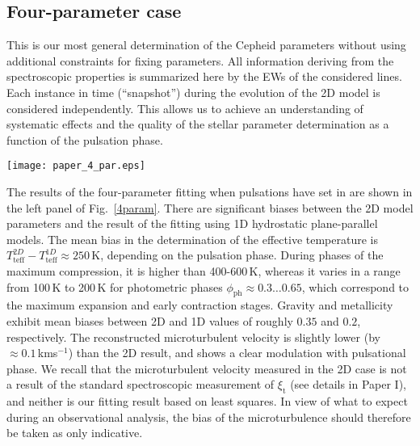\documentclass{aa}
\newcommand{\kmos}{kms$^{-1}$}
\begin{document}
\subsection{Four-parameter case}
This is our most general determination of the Cepheid parameters without using
additional constraints for fixing parameters. All information deriving from
the spectroscopic properties  is summarized here by the EWs of the
considered lines.  Each instance in time (``snapshot'') during the evolution
of the 2D model is considered independently.  This allows us to achieve an
understanding of systematic effects and the quality of the stellar
parameter determination as a function of the pulsation phase.
\begin{figure*}
\centering
\texttt{[image: paper\_4\_par.eps]}
\caption{Result of the four-parametric fitting for 
the pulsating (left panel) and non-pulsating (right panel) 
regimes. The parameters of the 2D model are shown by  orange 
lines for both regimes. The reconstructed parameters with the 1D LHD grid 
are shown by blue lines.  The relative RMS deviation $\sqrt{\xi^2}$ in  
line strengths  between the 2D  and 1D models is shown by the black line. 
}
\label{4param}
\end{figure*} 
The results of the four-parameter fitting when pulsations have set in are shown in
the left panel of Fig.~\ref{4param}.  There are significant biases between the
2D model parameters and the result of the fitting using 1D hydrostatic
plane-parallel models.  The mean bias in the determination of the effective
temperature is $T_\mathrm{teff}^{2D} -T_\mathrm{teff}^{1D} \approx 250$\,K,
depending on the pulsation phase.  During phases of the maximum
compression, it is higher than 400-600\,K, whereas  it varies in a range from
100\,K to 200\,K for photometric phases $\phi_\mathrm{ph} \approx 0.3 \ldots 0.65$, which correspond to the maximum
expansion and early contraction stages.  Gravity and metallicity exhibit mean biases between 2D and
1D values of roughly $0.35$ and $0.2$, respectively.  The reconstructed
microturbulent velocity is slightly lower (by $\approx 0.1$\,\kmos) than the 2D
result, and shows a clear modulation with pulsational phase. We recall that the microturbulent velocity measured in the 2D case is not a
result of the standard spectroscopic measurement of $\xi_\mathrm{t}$ (see
details in Paper I), and neither is our fitting result based on least squares. 
In view of what to expect during an observational analysis, the bias
of the microturbulence should therefore be taken as only indicative.
\end{document}
